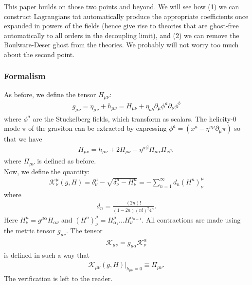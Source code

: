 \documentclass{book}
\theoremstyle{definition}
\newcommand{\p}{\partial}
\newcommand{\al}{\alpha}
\newcommand{\be}{\beta}
\newcommand{\f}[2]{\frac{#1}{#2}}
\begin{document}
This paper builds on those two points and beyond. We will see how (1) we can construct Lagrangians tat automatically produce the appropriate coefficients once expanded in powers of the fields (hence give rise to theories that are ghost-free automatically to all orders in the decoupling limit), and (2) we can remove the Boulware-Deser ghost from the theories. We probably will not worry too much about the second point.  




\newpage

\subsubsection{Formalism}

As before, we define the tensor $H_{\mu\nu}$:
\begin{align}
g_{\mu\nu} = \eta_{\mu\nu} + h_{\mu\nu} = H_{\mu\nu} + \eta_{ab}\p_\mu \phi^a\p_\nu \phi^b
\end{align}
where $\phi^a$ are the Stuckelberg fields, which transform as scalars. The helicity-0 mode $\pi$ of the graviton can be extracted by expressing $\phi^a = (x^a - \eta^{a\mu}\p_\mu \pi)$ so that we have
\begin{align}
H_{\mu\nu} = h_{\mu\nu} + 2\Pi_{\mu\nu} - \eta^{\al\be}\Pi_{\mu\al}\Pi_{\nu\be},
\end{align}
where $\Pi_{\mu\nu}$ is defined as before. \\

Now, we define the quantity:
\begin{align}
\boxed{\mathcal{K}^\mu_\nu (g,H) = \delta^\mu_\nu - \sqrt{\delta^\mu_\nu - H^\mu_\nu} = -\sum^\infty_{n=1}d_n(H^n)^\mu_\nu}
\end{align}
where
\begin{align}
d_n = \f{(2n)!}{(1-2n)(n!)^2 4^n}.
\end{align}
Here $H^\mu_\nu = g^{\mu\al}H_{\al\nu}$ and $(H^n)^\mu_\nu = H^\mu_{\al_1}\dots H^{\al_{n-1}}_\nu$. All contractions are made using the metric tensor $g_{\mu\nu}$. The tensor 
\begin{align}
\mathcal{K}_{\mu\nu} = g_{\mu\al}\mathcal{K}^\al_{\nu}
\end{align}
is defined in such a way that
\begin{align}
\mathcal{K}_{\mu\nu}(g,H)\bigg\vert_{h_{\mu\nu} = 0} \equiv \Pi_{\mu\nu}.
\end{align}
The verification is left to the reader. \\
\end{document}
